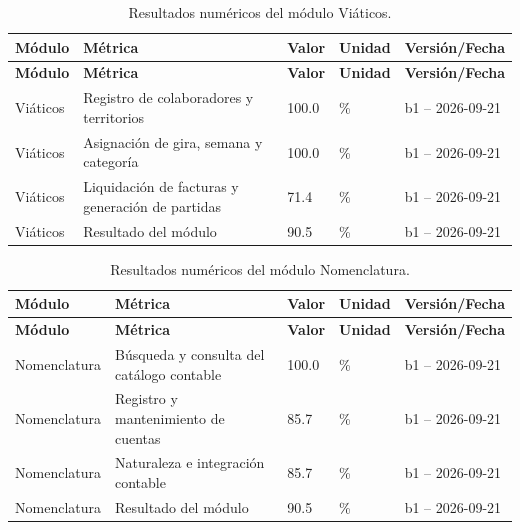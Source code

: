 \begingroup\fontsize{8}{9}\selectfont\setlength{\tabcolsep}{3pt}
\begin{xltabular}{\linewidth}{@{}p{3.0cm}p{5.2cm}p{1.5cm}p{1.5cm}p{3.0cm}@{}}

\caption{Resultados numéricos del módulo Viáticos.}\label{tab:cap4_resultados_viaticos}\\
\toprule
\textbf{Módulo} & \textbf{Métrica} & \textbf{Valor} & \textbf{Unidad} & \textbf{Versión/Fecha}\\
\midrule
\endfirsthead
\toprule
\textbf{Módulo} & \textbf{Métrica} & \textbf{Valor} & \textbf{Unidad} & \textbf{Versión/Fecha}\\
\midrule
\endhead
\endfoot
\bottomrule
\endlastfoot
Viáticos & Registro de colaboradores y territorios & 100.0 & \% & b1 -- 2026-09-21\\
Viáticos & Asignación de gira, semana y categoría & 100.0 & \% & b1 -- 2026-09-21\\
Viáticos & Liquidación de facturas y generación de partidas & 71.4 & \% & b1 -- 2026-09-21\\
Viáticos & Resultado del módulo & 90.5 & \% & b1 -- 2026-09-21\\
\end{xltabular}
\endgroup

\begingroup\fontsize{8}{9}\selectfont\setlength{\tabcolsep}{3pt}
\begin{xltabular}{\linewidth}{@{}p{3.0cm}p{5.2cm}p{1.5cm}p{1.5cm}p{3.0cm}@{}}

\caption{Resultados numéricos del módulo Nomenclatura.}\label{tab:cap4_resultados_nomenclatura}\\
\toprule
\textbf{Módulo} & \textbf{Métrica} & \textbf{Valor} & \textbf{Unidad} & \textbf{Versión/Fecha}\\
\midrule
\endfirsthead
\toprule
\textbf{Módulo} & \textbf{Métrica} & \textbf{Valor} & \textbf{Unidad} & \textbf{Versión/Fecha}\\
\midrule
\endhead
\endfoot
\bottomrule
\endlastfoot
Nomenclatura & Búsqueda y consulta del catálogo contable & 100.0 & \% & b1 -- 2026-09-21\\
Nomenclatura & Registro y mantenimiento de cuentas & 85.7 & \% & b1 -- 2026-09-21\\
Nomenclatura & Naturaleza e integración contable & 85.7 & \% & b1 -- 2026-09-21\\
Nomenclatura & Resultado del módulo & 90.5 & \% & b1 -- 2026-09-21\\
\end{xltabular}
\endgroup

